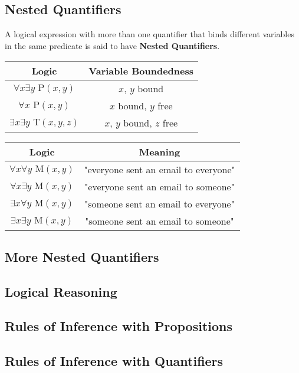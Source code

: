 \documentclass{article}
\begin{document}
\subsection{Nested Quantifiers}

A logical expression with more than one quantifier that binds different variables in the same predicate
is said to have \textbf{Nested Quantifiers}.

\begin{center}
  \begin{tabular}{c|c}
    Logic                                      & Variable Boundedness           \\
    \hline
    \(\forall x \exists y \text{ P}(x, y)\)    & \(x\), \(y\) bound             \\
    \(\forall x \text{ P}(x, y)\)              & \(x\) bound, \(y\) free        \\
    \(\exists x \exists y \text{ T}(x, y, z)\) & \(x\), \(y\) bound, \(z\) free \\
  \end{tabular}
  \quad
  \begin{tabular}{c|c}
    Logic                                  & Meaning                              \\
    \hline
    \(\forall x \forall y \text{ M}(x, y)\) & "everyone sent an email to everyone" \\
    \(\forall x \exists y \text{ M}(x, y)\) & "everyone sent an email to someone"  \\
    \(\exists x \forall y \text{ M}(x, y)\) & "someone sent an email to everyone"  \\
    \(\exists x \exists y \text{ M}(x, y)\) & "someone sent an email to someone"   \\
  \end{tabular}
\end{center}

\subsection{More Nested Quantifiers}



\subsection{Logical Reasoning}



\subsection{Rules of Inference with Propositions}



\subsection{Rules of Inference with Quantifiers}
\end{document}
